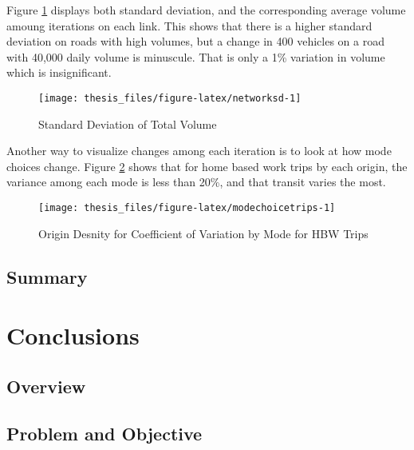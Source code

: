 \documentclass[fancy, masters,twoside]{byuthesis}
\begin{document}
Figure \ref{fig:networksd} displays both standard deviation, and the corresponding average volume amoung iterations on each link. This shows that there is a higher standard deviation on roads with high volumes, but a change in 400 vehicles on a road with 40,000 daily volume is minuscule. That is only a 1\% variation in volume which is insignificant.

\begin{figure}

{\centering \texttt{[image: thesis\_files/figure-latex/networksd-1]} 

}

\caption{Standard Deviation of Total Volume}\label{fig:networksd}
\end{figure}

Another way to visualize changes among each iteration is to look at how mode choices change. Figure \ref{fig:modechoicetrips} shows that for home based work trips by each origin, the variance among each mode is less than 20\%, and that transit varies the most.

\begin{figure}

{\centering \texttt{[image: thesis\_files/figure-latex/modechoicetrips-1]} 

}

\caption{Origin Desnity for Coefficient of Variation by Mode for HBW Trips}\label{fig:modechoicetrips}
\end{figure}

\hypertarget{summary-2}{%
\section{Summary}\label{summary-2}}

\hypertarget{conclusions}{%
\chapter{Conclusions}\label{conclusions}}

\hypertarget{overview-3}{%
\section{Overview}\label{overview-3}}

\hypertarget{problem-and-objective}{%
\section{Problem and Objective}\label{problem-and-objective}}
\end{document}
